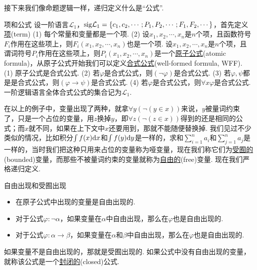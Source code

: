 \documentclass[main.tex]{subfiles}
\begin{document}
接下来我们像命题逻辑一样，递归定义什么是“公式”.

\begin{definition}{项和公式}
    设一阶语言\(\mathcal{L}_1\)，\({\rm sig}\mathcal{L}_1 = \{ c_1, c_2, \cdots; P_1, P_2, \cdots; F_1, F_2, \cdots \}\)，首先定义\uline{项}(term) \newline
    (1) 每个常量和变量都是一个项. \newline
    (2) 设\(x_1, x_2, \cdots, x_n\)是\(n\)个项，且函数符号\(F_i\)作用在这些项上，则\(F_i(x_1, x_2, \cdots, x_n)\)也是一个项. \newline
    设\(x_1, x_2, \cdots, x_n\)是\(n\)个项，且谓词符号\(P_i\)作用在这些项上，则\(P_i(x_1, x_2, \cdots, x_n)\)是一个\uline{原子公式}(atomic formula)，从原子公式开始我们可以定义\uline{合式公式}(well-formed formula, WFF). \newline
    (1) 原子公式是合式公式. \newline
    (2) 若\(\varphi\)是合式公式，则\((\neg \varphi)\)是合式公式. \newline
    (3) 若\(\varphi, \psi\)都是是合式公式，则\((\varphi \to \psi)\)是合式公式. \newline
    (4) 若\(\varphi\)是合式公式，则\(\forall x \varphi\)是合式公式.\newline
    一阶逻辑语言全体合式公式的集合记为\(\mathcal{L}_1\).
\end{definition}


在以上的例子中，变量出现了两种，就拿\(\forall y (\neg (y \in x))\)来说，\(y\)被量词约束了，只是一个占位的变量，用\(z\)换掉\(y\)，即\(\forall z (\neg (z \in x))\)得到的还是相同的公式；而\(x\)就不同，如果在上下文中\(x\)还要用到，那就不能随便替换掉. 我们见过不少类似的情况，比如积分\(\int f(x){\rm d}x\)和\(\int f(y){\rm d}y\)是一样的，求和\(\sum_{i=1}^na_i\)和\(\sum_{j=1}^na_j\)是一样的，当时我们把这种只用来占位的变量称为哑变量，现在我们称它们为\uline{受囿的}(bounded)变量，而那些不被量词约束的变量就称为\uline{自由的}(free)变量. 现在我们严格递归定义.

\begin{definition}{自由出现和受囿出现}
    \begin{itemize}
        \item 在原子公式中出现的变量是自由出现的.
        \item 对于公式\(\varphi: \neg \alpha\)，如果变量在\(\alpha\)中自由出现，那么在\(\varphi\)也是自由出现的.
        \item 对于公式\(\varphi: \alpha \to \beta\)，如果变量在\(\alpha\)和\(\beta\)中自由出现，那么在\(\varphi\)也是自由出现的.
    \end{itemize}
    如果变量不是自由出现的，那就是受囿出现的. 如果公式中没有自由出现的变量，就称该公式是一个\uline{封闭的}(closed)公式.
\end{definition}
\end{document}
